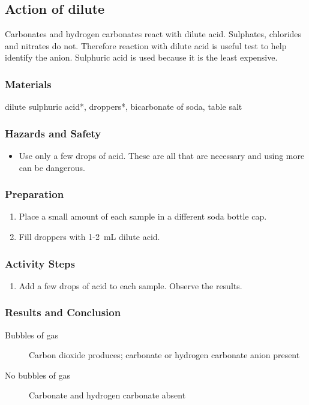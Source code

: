 \subsection{Action of dilute }

Carbonates and hydrogen carbonates react with dilute acid. Sulphates, chlorides and nitrates do not. Therefore reaction with dilute acid is useful test to help identify the anion. Sulphuric acid is used because it is the least expensive.

\subsubsection{Materials}
dilute sulphuric acid*, droppers*, bicarbonate of soda, table salt

\subsubsection{Hazards and Safety}
\begin{itemize}
\item{Use only a few drops of acid. These are all that are necessary and using more can be dangerous.}
\end{itemize}

\subsubsection{Preparation}
\begin{enumerate}
\item{Place a small amount of each sample in a different soda bottle cap.}
\item{Fill droppers with 1-2~mL dilute acid.}
\end{enumerate}

\subsubsection{Activity Steps}
\begin{enumerate}
\item{Add a few drops of acid to each sample. Observe the results.}
\end{enumerate}

\subsubsection{Results and Conclusion}
\begin{description}
\item[Bubbles of gas]{Carbon dioxide produces; carbonate or hydrogen carbonate anion present}
\item[No bubbles of gas]{Carbonate and hydrogen carbonate absent}
\end{description}

